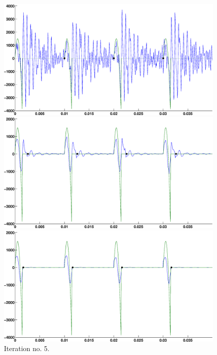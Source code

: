 \documentclass[12pt,a4]{article}
\begin{document}
\begin{figure}[H]
\begin{center}
 \caption*{In figures \ref{fig:app1-beginning} to \ref{fig:app1-end} the signal frequency is 120 Hz. The approximation algorithm acquired $Q_{guess} = 0.165$ at the end of the iterations, while the actual parameter $Q = 0.15$, relative error of the reconstruction $\approx$ 64.6\%, $\alpha \approx 84.5$. }
 \includegraphics[scale=.3]{img/Approx_iter_wRef-v2-1.eps}
 \caption{Iteration no. 1}\label{fig:app1-beginning}
 \includegraphics[scale=.3]{img/Approx_iter_wRef-v2-2.eps}
 \caption{Iteration no. 2}
 \includegraphics[scale=.3]{img/Approx_iter_wRef-v2-4.eps}
 \caption{Iteration no. 5.}
\end{center}
\end{figure}
\end{document}
